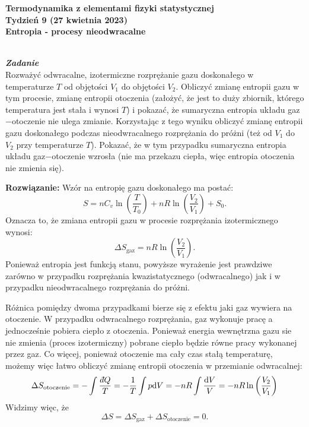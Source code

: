 \documentclass[11pt,a4paper]{article}
\newcommand{\dd}{{{\rm d}}}
\newcounter{zadanie}\newcommand{\zadanie}[1][]{\addtocounter{zadanie}{1} ~\\  {\bf \emph{Zadanie \arabic{zadanie} #1 }} \\}
\newcommand{\dbar}{{\mkern3mu\mathchar'26\mkern-12mu d}}
\begin{document}

\begin{centering}
\bf{\Large{Termodynamika z elementami fizyki statystycznej}}\\
Tydzień 9 (27 kwietnia 2023)\\[3mm]
Entropia - procesy nieodwracalne\\
\end{centering}
\vspace{5mm}

\zadanie
Rozważyć odwracalne, izotermiczne rozprężanie gazu doskonałego w temperaturze $T$
od objętości $V_1$ do objętości $V_2$. Obliczyć zmianę entropii gazu w tym
procesie, zmianę entropii otoczenia (założyć, że jest to duży zbiornik, którego
temperatura jest stała i wynosi $T$) i pokazać, że sumaryczna entropia układu gaz$-$otoczenie
nie ulega zmianie.
Korzystając z tego wyniku obliczyć zmianę entropii gazu doskonałego
podczas nieodwracalnego rozprężania do próżni (też od $V_1$ do $V_2$ przy temperaturze $T$). Pokazać, że w tym przypadku sumaryczna entropia
układu gaz$-$otoczenie wzrosła (nie ma przekazu ciepła, więc entropia otoczenia
nie zmienia się).
\newline

\vskip 10pt
\noindent
\textbf{Rozwiązanie:}
Wzór na entropię gazu doskonałego ma postać:
\begin{equation}
  S = n C_v \ln \left(\frac{T}{T_0}\right) + n R \ln \left(\frac{V_2}{V_1}\right) + S_0.
\end{equation}
Oznacza to, że zmiana entropii gazu w procesie rozprężania izotermicznego wynosi:
\begin{equation}
  \Delta S_{\textrm{gaz}} = n R \ln \left(\frac{V_2}{V_1} \right).
\end{equation}
Ponieważ entropia jest funkcją stanu, powyższe wyrażenie jest prawdziwe zarówno w przypadku rozprężania kwazistatycznego (odwracalnego) jak i
w przypadku nieodwracalnego rozprężania do próżni.

Różnica pomiędzy dwoma przypadkami bierze się z efektu jaki gaz wywiera na otoczenie. W przypadku odwracalnego rozprężania, gaz wykonuje pracę a jednocześnie pobiera ciepło z otoczenia. Ponieważ energia wewnętrzna gazu sie nie zmienia (proces izotermiczny)
pobrane ciepło będzie równe pracy wykonanej przez gaz. Co więcej, ponieważ otoczenie ma cały czas stałą temperaturę, możemy więc łatwo obliczyć zmianę entropii otoczenia w przemianie odwracalnej:
\begin{equation}
  \Delta S_{\textrm{otoczenie}} = - \int \frac{\dbar Q}{T} = - \frac{1}{T}\int p \dd V =  -n R \int \frac{\dd V}{V}=
  - n R \ln \left(\frac{V_2}{V_1} \right)
\end{equation}
Widzimy więc, że
\begin{equation}
  \Delta S = \Delta S_{\textrm{gaz}} +  \Delta S_{\textrm{otoczenie}} = 0.
\end{equation}
\end{document}
